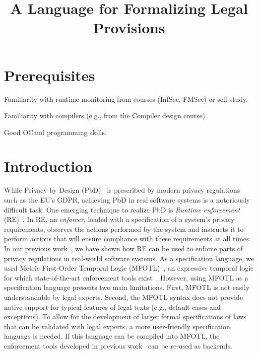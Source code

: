 \documentclass{proposal}
\title{\!\!\!\!A Language for Formalizing Legal Provisions\!\!\!\!}
\begin{document}
\vspace*{-3ex}
\section{Prerequisites}

\begin{compactitem}
\item Familiarity with runtime monitoring from courses (InfSec, FMSec) or self-study. 
\item Familiarity with compilers (e.g., from the Compiler design course).
\item Good OCaml programming skills.
\end{compactitem}

\section{Introduction}

While Privacy by Design (PbD)~\cite{Cavoukian2009} is prescribed by modern privacy
regulations such as the EU's GDPR, achieving PbD in real
software systems is a notoriously difficult task. One emerging
technique to realize PbD is \emph{Runtime enforcement} (RE)~\cite{Schneider2000}. In RE, an \emph{enforcer}, loaded with a specification of a system's privacy requirements, observes the actions performed by the system and instructs it to perform actions that will ensure compliance with these requirements at all times.
In our previous work~\cite{Hublet2023,Hublet2024}, we have shown how RE can be used to enforce parts of privacy regulations in real-world software systems. As a specification language, we used Metric First-Order Temporal Logic (MFOTL)~\cite{Chomicki1995,Basin2015}, an expressive temporal logic for which state-of-the-art enforcement tools exist~\cite{Hublet2022,Hublet2024}.
However, using MFOTL as a specification language presents two main limitations. First, MFOTL is not easily understandable by legal experts. Second, the MFOTL syntax does not provide native support for typical features of legal texts (e.g., default cases and exceptions).
To allow for the development of larger formal specifications of laws that can be validated with legal experts, a more user-friendly specification language is needed. If this language can be compiled into MFOTL, the enforcement tools developed in previous work~\cite{Hublet2022,Hublet2024} can be re-used as backends.
\end{document}
